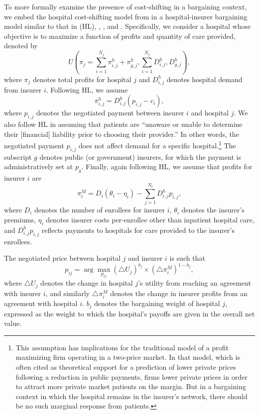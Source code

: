 \documentclass[12pt]{article}
\begin{document}
To more formally examine the presence of cost-shifting in a bargaining context, we embed the hospital cost-shifting model from \cite{dranove1988} in a hospital-insurer bargaining model similar to that in \cite{ho2017} (HL), \cite{gowrisankaran2015}, \cite{lewis2015}, and \cite{dor2004}. Specifically, we consider a hospital whose objective is to maximize a function of profits and quantity of care provided, denoted by
\begin{equation}
 U\left( \pi_{j} = \sum_{i=1}^{N_{j}} \pi_{i,j}^{h} + \pi_{g,j}^{h}, \sum_{i=1}^{N_{j}} D_{i,j}^{h}, D_{g,j}^{h} \right),
\label{eqn:nfp_objective}
\end{equation}
where $\pi_{j}$ denotes total profits for hospital $j$ and $D_{i,j}^{h}$ denotes hospital demand from insurer $i$. Following HL, we assume $$\pi_{i,j}^{h}=D_{i,j}^{h}(p_{i,j}-c_{i}),$$ where $p_{i,j}$ denotes the negotiated payment between insurer $i$ and hospital $j$. We also follow HL in assuming that patients are ``unaware or unable to determine their [financial] liability prior to choosing their provider.'' In other words, the negotiated payment $p_{i,j}$ does not affect demand for a specific hospital.\footnote{This assumption has implications for the traditional model of a profit maximizing firm operating in a two-price market. In that model, which is often cited as theoretical support for a prediction of lower private prices following a reduction in public payments, firms lower private prices in order to attract more private market patients on the margin. But in a bargaining context in which the hospital remains in the insurer's network, there should be no such marginal response from patients.} The subscript $g$ denotes public (or government) insurers, for which the payment is administratively set at $p_{g}$. Finally, again following HL, we assume that profits for insurer $i$ are
\begin{equation}
\pi_{i}^{M} = D_{i} \left( \theta_{i} - \eta_{i} \right) - \sum_{j=1}^{N_{i}} D_{i,j}^{h} p_{i,j},
\label{eqn:ins_profit}
\end{equation}
where $D_{i}$ denotes the number of enrollees for insurer $i$, $\theta_{i}$ denotes the insurer's premiums, $\eta_{i}$ denotes insurer costs per-enrollee other than inpatient hospital care, and $D_{i,j}^{h} p_{i,j}$ reflects payments to hospitals for care provided to the insurer's enrollees.

The negotiated price between hospital $j$ and insurer $i$ is such that
\begin{equation}
 p_{ij}= \arg \max_{p_{ij}} \left(\triangle U_{j} \right)^{b_{j}} \times \left(\triangle \pi^{M}_{i} \right)^{1-b_{j}},
 \label{eqn:neg_price}
\end{equation}
where $\triangle U_{j}$ denotes the change in hospital $j$'s utility from reaching an agreement with insurer $i$, and similarly $\triangle \pi^{M}_{i}$ denotes the change in insurer profits from an agreement with hospital $i$. $b_{j}$ denotes the bargaining weight of hospital $j$, expressed as the weight to which the hospital's payoffs are given in the overall net value.
\end{document}
